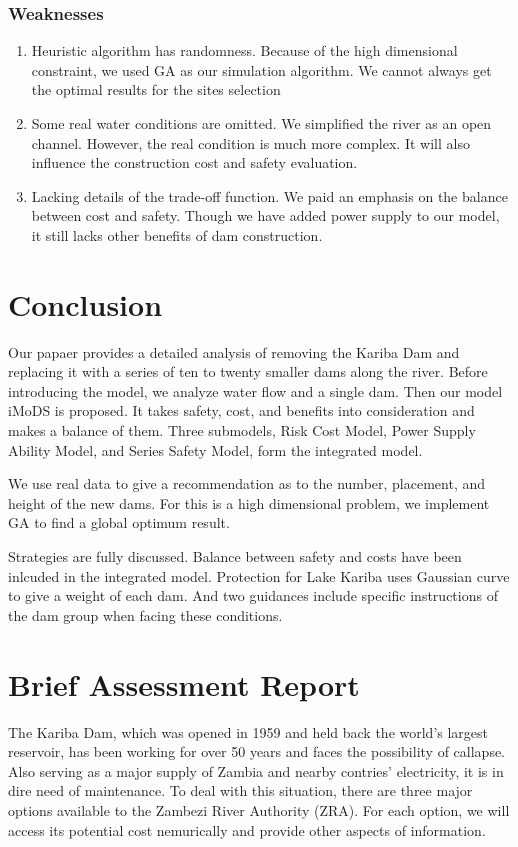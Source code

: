 \documentclass{mcmthesis}
\begin{document}
\subsubsection{Weaknesses}
\begin{enumerate}
\item Heuristic algorithm has randomness. Because of the high dimensional constraint, we used GA as our simulation algorithm. We cannot always get the optimal results for the sites selection
\item Some real water conditions are omitted. We simplified the river as an open channel. However, the real condition is much more complex. It will also influence the construction cost and safety evaluation.
\item Lacking details of the trade-off function. We paid an emphasis on the balance between cost and safety. Though we have added power supply to our model, it still lacks other benefits of dam construction.
\end{enumerate}
\section{Conclusion} \label{Sec-Conclusion}
Our papaer provides a detailed analysis of removing the Kariba Dam and replacing it with a series of ten to twenty smaller dams along the river. Before introducing the model, we analyze water flow and a single dam. Then our model iMoDS is proposed. It takes safety, cost, and benefits into consideration and makes a balance of them. Three submodels, Risk Cost Model, Power Supply Ability Model, and Series Safety Model, form the integrated model.

We use real data to give a recommendation as to the number, placement, and height of the new dams. For this is a high dimensional problem, we implement GA to find a global optimum result.

Strategies are fully discussed. Balance between safety and costs have been inlcuded in the integrated model. Protection for Lake Kariba uses Gaussian curve to give a weight of each dam. And two guidances include specific instructions of the dam group when facing these conditions.


\newpage
\section*{Brief Assessment Report}
The Kariba Dam, which was opened in 1959 and held back the world's largest reservoir, has been working for over 50 years and faces the possibility of callapse. Also serving as a major supply of Zambia and nearby contries' electricity, it is in dire need of maintenance. To deal with this situation, there are three major options available to the Zambezi River Authority (ZRA). For each option, we will access its potential cost nemurically and provide other aspects of information.
\end{document}
